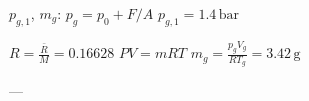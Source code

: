 \( p_{g,1} \), \( m_g \):  
\( p_g = p_0 + F/A \)  
\( p_{g,1} = 1.4 \, \text{bar} \)  

\( R = \frac{\bar{R}}{M} = 0.16628 \)  
\( PV = mRT \)  
\( m_g = \frac{p_g V_g}{R T_g} = 3.42 \, \text{g} \)  

---